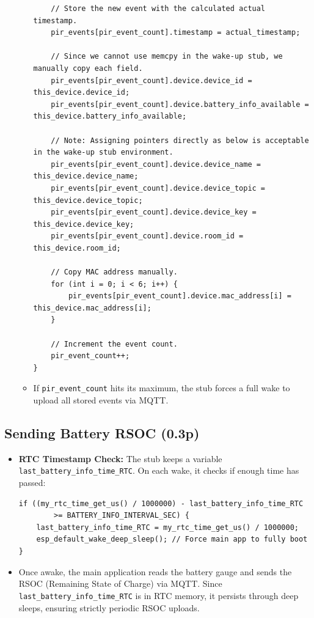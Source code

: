 \documentclass[A4,10pt]{article}
\begin{document}
\begin{itemize}
\begin{itemize}
\begin{verbatim}
    // Store the new event with the calculated actual timestamp.
    pir_events[pir_event_count].timestamp = actual_timestamp;

    // Since we cannot use memcpy in the wake-up stub, we manually copy each field.
    pir_events[pir_event_count].device.device_id = this_device.device_id;
    pir_events[pir_event_count].device.battery_info_available = this_device.battery_info_available;

    // Note: Assigning pointers directly as below is acceptable in the wake-up stub environment.
    pir_events[pir_event_count].device.device_name = this_device.device_name;
    pir_events[pir_event_count].device.device_topic = this_device.device_topic;
    pir_events[pir_event_count].device.device_key = this_device.device_key;
    pir_events[pir_event_count].device.room_id = this_device.room_id;

    // Copy MAC address manually.
    for (int i = 0; i < 6; i++) {
        pir_events[pir_event_count].device.mac_address[i] = this_device.mac_address[i];
    }

    // Increment the event count.
    pir_event_count++;
}
\end{verbatim}
        \item If \texttt{pir\_event\_count} hits its maximum, the stub forces a full wake to upload all stored events via MQTT.
    \end{itemize}
\end{itemize}

\subsection{Sending Battery RSOC (0.3p)}
\label{sec:battery_rsoc}

\begin{itemize}
    \item \textbf{RTC Timestamp Check:} The stub keeps a variable \texttt{last\_battery\_info\_time\_RTC}. On each wake, it checks if enough time has passed:
\begin{verbatim}
if ((my_rtc_time_get_us() / 1000000) - last_battery_info_time_RTC 
        >= BATTERY_INFO_INTERVAL_SEC) {
    last_battery_info_time_RTC = my_rtc_time_get_us() / 1000000;
    esp_default_wake_deep_sleep(); // Force main app to fully boot
}
\end{verbatim}
    \item Once awake, the main application reads the battery gauge and sends the RSOC (Remaining State of Charge) via MQTT. Since \texttt{last\_battery\_info\_time\_RTC} is in RTC memory, it persists through deep sleeps, ensuring strictly periodic RSOC uploads.
\end{itemize}
\end{document}
